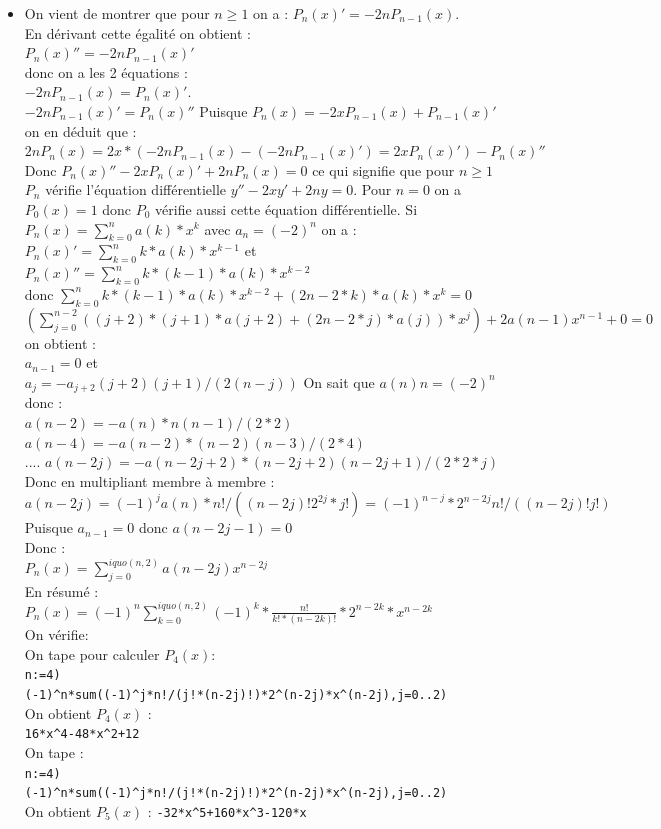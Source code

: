 \documentclass[a4paper,11pt]{book}
\begin{document}
\begin{itemize}
\item On vient de montrer que pour $n\geq 1$ on a :
$P_n(x)'=-2nP_{n-1}(x)$.\\
En d\'erivant cette \'egalit\'e on obtient :\\
$P_n(x)''=-2nP_{n-1}(x)'$ \\
donc on a les 2 \'equations :\\
$-2nP_{n-1}(x)=P_n(x)'$.\\
$-2nP_{n-1}(x)'=P_n(x)''$
Puisque $P_n(x)=-2xP_{n-1}(x)+P_{n-1}(x)'$ on en d\'eduit que :\\
$2nP_n(x)=2x*(-2nP_{n-1}(x)-(-2nP_{n-1}(x)')=2xP_n(x)')-P_n(x)''$ \\
Donc $P_n(x)''-2xP_n(x)'+2nP_n(x)=0$ ce qui signifie que pour $n\geq 1$
$P_n$ v\'erifie l'\'equation diff\'erentielle $y''-2xy'+2ny=0$.
Pour $n=0$ on a $P_0(x)=1$ donc $P_0$ v\'erifie aussi cette \'equation 
diff\'erentielle.
Si $P_n(x)=\sum_{k=0}^na(k)*x^k$ avec $a_n=(-2)^n$ on a :\\
$P_n(x)'=\sum_{k=0}^nk*a(k)*x^{k-1}$ et\\
$P_n(x)''=\sum_{k=0}^nk*(k-1)*a(k)*x^{k-2}$\\
donc
$\sum_{k=0}^nk*(k-1)*a(k)*x^{k-2}+(2n-2*k)*a(k)*x^k=0$\\
$(\sum_{j=0}^{n-2}((j+2)*(j+1)*a(j+2)+(2n-2*j)*a(j))*x^j)+2a(n-1)x^{n-1}+0=0$\\
on obtient :\\
$a_{n-1}=0$ et\\
$a_j=-a_{j+2}(j+2)(j+1)/(2(n-j))$
On sait que $a(n)n=(-2)^n$ donc :\\
$a(n-2)=-a(n)*n(n-1)/(2*2)$\\
$a(n-4)=-a(n-2)*(n-2)(n-3)/(2*4)$\\
....
$a(n-2j)=-a(n-2j+2)*(n-2j+2)(n-2j+1)/(2*2*j)$\\
Donc en multipliant membre \`a membre :\\
$a(n-2j)=(-1)^ja(n)*n!/((n-2j)!2^{2j}*j!)=(-1)^{n-j}*2^{n-2j}n!/((n-2j)!j!)$\\
Puisque $a_{n-1}=0$ donc $a(n-2j-1)=0$\\
Donc :\\
$P_n(x)=\sum_{j=0}^{iquo(n,2)}a(n-2j)x^{n-2j}$\\
En r\'esum\'e :\\
$P_n(x)=(-1)^n\sum_{k=0}^{iquo(n,2)}(-1)^{k}*\frac{n!}{k!*(n-2k)!}*2^{n-2k}*x^{n-2k}$\\
On v\'erifie:\\
On tape pour calculer $P_4(x)$:\\
{\tt n:=4)}\\
{\tt (-1)\verb|^|n*sum((-1)\verb|^|j*n!/(j!*(n-2j)!)*2\verb|^|(n-2j)*x\verb|^|(n-2j),j=0..2)}\\
On obtient $P_4(x)$ :\\
{\tt 16*x\verb|^|4-48*x\verb|^|2+12}\\
On tape :\\
{\tt n:=4)}\\
{\tt (-1)\verb|^|n*sum((-1)\verb|^|j*n!/(j!*(n-2j)!)*2\verb|^|(n-2j)*x\verb|^|(n-2j),j=0..2)}\\
On obtient $P_5(x)$ :
{\tt -32*x\verb|^|5+160*x\verb|^|3-120*x}
\end{itemize}
\end{document}
